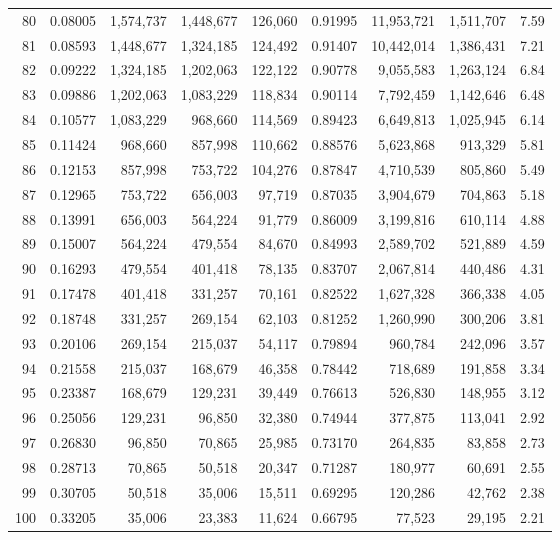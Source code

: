\begin{longtable}{rrrrrrrrr}
80 & 0.08005 & 1,574,737 & 1,448,677 & 126,060 & 0.91995 & 11,953,721 & 1,511,707 & 7.59 \\
81 & 0.08593 & 1,448,677 & 1,324,185 & 124,492 & 0.91407 & 10,442,014 & 1,386,431 & 7.21 \\
82 & 0.09222 & 1,324,185 & 1,202,063 & 122,122 & 0.90778 & 9,055,583 & 1,263,124 & 6.84 \\
83 & 0.09886 & 1,202,063 & 1,083,229 & 118,834 & 0.90114 & 7,792,459 & 1,142,646 & 6.48 \\
84 & 0.10577 & 1,083,229 & 968,660 & 114,569 & 0.89423 & 6,649,813 & 1,025,945 & 6.14 \\
85 & 0.11424 & 968,660 & 857,998 & 110,662 & 0.88576 & 5,623,868 & 913,329 & 5.81 \\
86 & 0.12153 & 857,998 & 753,722 & 104,276 & 0.87847 & 4,710,539 & 805,860 & 5.49 \\
87 & 0.12965 & 753,722 & 656,003 & 97,719 & 0.87035 & 3,904,679 & 704,863 & 5.18 \\
88 & 0.13991 & 656,003 & 564,224 & 91,779 & 0.86009 & 3,199,816 & 610,114 & 4.88 \\
89 & 0.15007 & 564,224 & 479,554 & 84,670 & 0.84993 & 2,589,702 & 521,889 & 4.59 \\
90 & 0.16293 & 479,554 & 401,418 & 78,135 & 0.83707 & 2,067,814 & 440,486 & 4.31 \\
91 & 0.17478 & 401,418 & 331,257 & 70,161 & 0.82522 & 1,627,328 & 366,338 & 4.05 \\
92 & 0.18748 & 331,257 & 269,154 & 62,103 & 0.81252 & 1,260,990 & 300,206 & 3.81 \\
93 & 0.20106 & 269,154 & 215,037 & 54,117 & 0.79894 & 960,784 & 242,096 & 3.57 \\
94 & 0.21558 & 215,037 & 168,679 & 46,358 & 0.78442 & 718,689 & 191,858 & 3.34 \\
95 & 0.23387 & 168,679 & 129,231 & 39,449 & 0.76613 & 526,830 & 148,955 & 3.12 \\
96 & 0.25056 & 129,231 & 96,850 & 32,380 & 0.74944 & 377,875 & 113,041 & 2.92 \\
97 & 0.26830 & 96,850 & 70,865 & 25,985 & 0.73170 & 264,835 & 83,858 & 2.73 \\
98 & 0.28713 & 70,865 & 50,518 & 20,347 & 0.71287 & 180,977 & 60,691 & 2.55 \\
99 & 0.30705 & 50,518 & 35,006 & 15,511 & 0.69295 & 120,286 & 42,762 & 2.38 \\
100 & 0.33205 & 35,006 & 23,383 & 11,624 & 0.66795 & 77,523 & 29,195 & 2.21 \\

\end{longtable}
